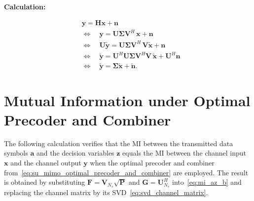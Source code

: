 \textbf{Calculation:}
\begin{fleqn}[2.5em]
\begin{subequations}
\begin{align*}
    & \mathbf{y} = \mathbf{H} \mathbf{x} + \mathbf{n} \\
    & \Leftrightarrow \quad \mathbf{y} = \mathbf{U} \mathbf{\Sigma} \mathbf{V}^H \, \mathbf{x} + \mathbf{n} \\
    & \Leftrightarrow \quad \mathbf{U} \tilde{\mathbf{y}} = \mathbf{U} \mathbf{\Sigma} \mathbf{V}^H \, \mathbf{V} \tilde{\mathbf{x}} + \mathbf{n} \\
    & \Leftrightarrow \quad \tilde{\mathbf{y}} = \mathbf{U}^H \mathbf{U} \mathbf{\Sigma} \mathbf{V}^H \mathbf{V} \, \tilde{\mathbf{x}} + \mathbf{U}^H \mathbf{n} \\
    & \Leftrightarrow \quad \tilde{\mathbf{y}} = \mathbf{\Sigma} \tilde{\mathbf{x}} + \tilde{\mathbf{n}}.
\end{align*}
\end{subequations}
\end{fleqn}

\section*{Mutual Information under Optimal Precoder and Combiner}
\label{calculation:su_mimo_optimal_precoder_mi}

The following calculation verifies that the \ac{MI} between the transmitted data symbols $\mathbf{a}$ and the decision variables $\mathbf{z}$ equals the \ac{MI} between the channel input $\mathbf{x}$ and the channel output $\mathbf{y}$ when the optimal precoder and combiner from~\eqref{eq:su_mimo_optimal_precoder_and_combiner} are employed.
The result is obtained by substituting $\mathbf{F} = \mathbf{V}_{N_s}\sqrt{\mathbf{P}}$ and $\mathbf{G} = \mathbf{U}_{N_s}^H$ into~\eqref{eq:mi_az_b} and replacing the channel matrix by its \ac{SVD}~\eqref{eq:svd_channel_matrix}.

